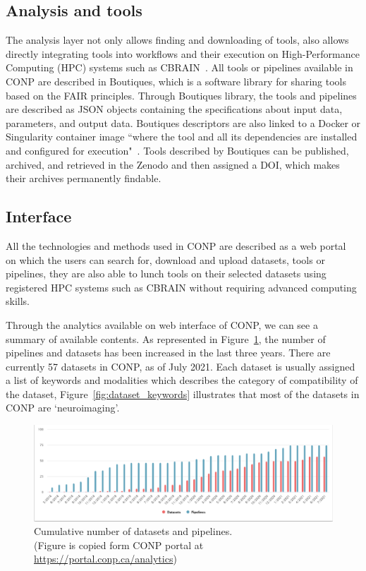 \subsection{Analysis and tools}
The analysis layer not only allows finding and downloading of tools, also allows directly integrating tools into workflows and their execution on High-Performance Computing (HPC) systems such as CBRAIN~\cite{sherif2014cbrain,vaccarino2018brain}. All tools or pipelines available in CONP are described in Boutiques, which is a software library for sharing tools based on the FAIR principles. Through Boutiques library, the tools and pipelines are described as JSON objects containing the specifications about input data, parameters, and output data. 
Boutiques descriptors are also linked to a Docker or Singularity container image ``where the tool and all its dependencies are installed and configured for execution"~\cite{conp}. Tools described by Boutiques  can be published, archived, and retrieved in the Zenodo and then assigned a DOI, which makes their archives permanently findable.

\subsection{Interface}
All the technologies and methods used in CONP are described as a web portal~\cite{CONP_Portal} on which the users can search for, download and upload datasets, tools or pipelines, they are also able to lunch tools on their selected datasets using registered HPC systems such as CBRAIN without requiring advanced computing skills. 

Through the analytics available on web interface of CONP, we can see a summary of available contents. As represented in Figure~\ref{fig:cumulative}, the number of pipelines and datasets has been increased in the last three years. There are currently 57 datasets in CONP, as of July 2021. Each dataset is usually assigned a list of keywords and modalities which describes the category of compatibility of the dataset, Figure~\ref{fig:dataset_keywords} illustrates that most of the datasets in CONP are `neuroimaging'.


\begin{figure}[ht]
  \centering
  \includegraphics[width=\textwidth,height=\textheight,keepaspectratio]{figures/PipeDataTime.png}
  \caption{Cumulative number of datasets and pipelines. \\(Figure is copied form CONP portal at \url{https://portal.conp.ca/analytics})}
  \label{fig:cumulative}
  \end{figure}

